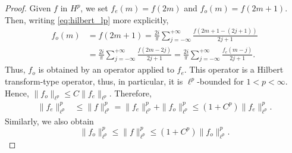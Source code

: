 \documentclass[12pt,a4paper,reqno]{amsart}
\theoremstyle{definition}
\theoremstyle{definition}\newtheorem{defn}[thm]{Definition}
\begin{document}
    \begin{proof}
     Given $f$ in $H^p$, we set $f_e(m)=f(2m)$ and $f_o(m)=f(2m+1)$. Then, writing 
    \eqref{eq:hilbert_lp} more explicitly,\begin{align*}
    f_o(m)&=  f(2m+1)=\frac{2i}{\pi}\sum_{j=-\infty}^{+\infty}\frac{f(2m+1-(2j+1))}{2j+1}  \\
     &=\frac{2i}{\pi}\sum_{j=-\infty}^{+\infty} \frac{f(2m-2j)}{2j+1}=\frac{2i}{\pi}\sum_{j=-\infty}^{+\infty}\frac{f_e(m-j)}{2j+1}.
     \end{align*}
     Thus, $f_o$ is obtained by an operator applied to $f_e$. This operator is a Hilbert transform-type operator, thus, in particular, it is $\ell^p$-bounded for $1<p<\infty$. Hence, $\|f_o\|_{\ell^p}\leqslant C\| f_e\|_{\ell^p}$. Therefore, 
     \begin{align*}
    \|f_e\|_{\ell^p}^p&\leqslant \|f\|^p_{\ell^p}=\|f_e\|_{\ell^p}^p+\|f_o\|_{\ell^p}^p\leqslant (1+C^p)\|f_e\|_{\ell^p}^p.
    \end{align*}
     Similarly, we also obtain
    \[
    \|f_o\|_{\ell^p}^p\leqslant \|f\|^p_{\ell^p}\leqslant (1+C^p)\|f_o\|_{\ell^p}^p.
    \]
    \end{proof}
    
\end{document}
